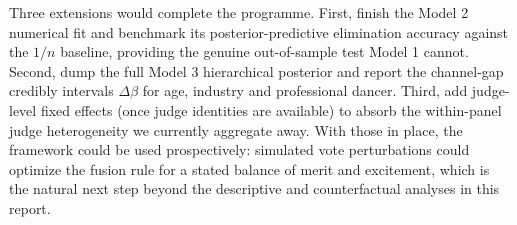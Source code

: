 \documentclass{article}
\begin{document}
Three extensions would complete the programme. First, finish the Model 2 numerical fit and
benchmark its posterior-predictive elimination accuracy against the $1/n$ baseline, providing
the genuine out-of-sample test Model 1 cannot. Second, dump the full Model 3 hierarchical
posterior and report the channel-gap credibly intervals $\Delta\beta$ for age, industry and
professional dancer. Third, add judge-level fixed effects (once judge identities are
available) to absorb the within-panel judge heterogeneity we currently aggregate away. With
those in place, the framework could be used prospectively: simulated vote perturbations could
optimize the fusion rule for a stated balance of merit and excitement, which is the natural
next step beyond the descriptive and counterfactual analyses in this report.

\newpage
\appendix


\newpage
\end{document}
